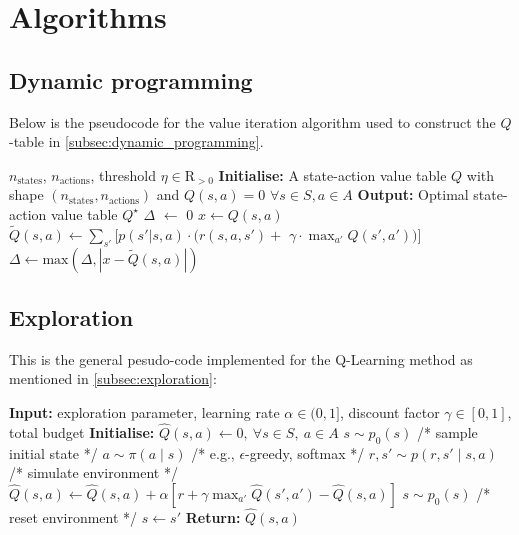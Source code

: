 \documentclass{article}
\theoremstyle{plain}
\theoremstyle{definition}
\theoremstyle{remark}
\begin{document}
{\section{Algorithms}\label{app:algorithms}

\subsection{Dynamic programming}
Below is the pseudocode for the value iteration algorithm used to construct the $Q$-table in \autoref{subsec:dynamic_programming}.
\begin{algorithm}[H]
   \caption{Tabular Q-value iteration}
   \label{alg:Q_value_iteration}
\begin{algorithmic}
    $n_\text{states}$, $n_\text{actions}$, threshold $\eta \in\mathrm{R}_{>0}$
   \STATE \textbf{Initialise:} A state-action value table $Q$ with shape $(n_\text{states},n_\text{actions})$ and $Q(s,a)=0$ $\forall s\in S, a \in A$
   \STATE \textbf{Output:} Optimal state-action value table $Q^\star$
   \REPEAT
   \STATE $\Delta$ $\leftarrow$ 0
   \STATE $x \leftarrow Q(s,a)$ \\
   \STATE $\tilde{Q}(s,a) \leftarrow \sum_{s'}[p(s'|s,a) \cdot (r(s,a,s')+$
   \STATE $\gamma \cdot \max_{a'}Q(s',a'))]$ \\
   \STATE $\Delta \leftarrow \text{max}\left(\Delta,|x - \tilde{Q}(s,a)|\right)$
   \ENDFOR
   \ENDFOR
   \UNTIL{$\Delta < \eta$}
\end{algorithmic}
\end{algorithm}

\subsection{Exploration}
This is the general pesudo-code implemented for the Q-Learning method as mentioned in \autoref{subsec:exploration}:

\begin{algorithm}[H]
   \caption{Tabular Q-learning}
   \label{alg:tabular_q_learning}
\begin{algorithmic}
   \STATE \textbf{Input:} exploration parameter, learning rate $\alpha \in (0,1]$, discount factor $\gamma \in [0,1]$, total budget
   \STATE \textbf{Initialise:} $\hat{Q}(s,a)\leftarrow 0,\ \forall s\in S,\ a\in A$
   \STATE $s \sim p_0(s)$ \hfill /* sample initial state */
      \STATE $a \sim \pi(a\mid s)$ \hfill /* e.g., $\epsilon$-greedy, softmax */
      \STATE $r,s' \sim p(r,s' \mid s,a)$ \hfill /* simulate environment */
      \STATE $\hat{Q}(s,a)\leftarrow \hat{Q}(s,a)+\alpha\left[r+\gamma\max_{a'}\hat{Q}(s',a')-\hat{Q}(s,a)\right]$
         \STATE $s \sim p_0(s)$ \hfill /* reset environment */
      \ELSE
         \STATE $s \leftarrow s'$
      \ENDIF
   \ENDWHILE
   \STATE \textbf{Return:} $\hat{Q}(s,a)$
\end{algorithmic}
\end{algorithm}

}
\end{document}
